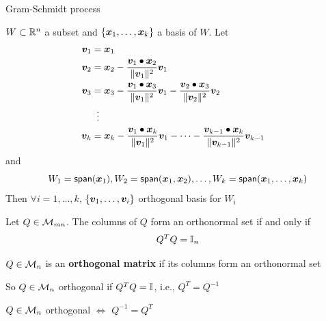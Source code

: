 \documentclass[aspectratio=169]{beamer}\usepackage[]{graphicx}\usepackage[]{xcolor}
\begin{document}
	\begin{frame}{Gram-Schmidt process}
	\begin{theorem}
	$W\subset\mathbb{R}^n$ a subset and $\{\bm{x}_1,\ldots,\bm{x}_k\}$ a basis of $W$. Let
	\begin{align*}
	\bm{v}_1 &= \bm{x}_1 \\
	\bm{v}_2 &= \bm{x}_2 -\frac{\bm{v}_1\bullet\bm{x}_2}{\|\bm{v}_1\|^2}\bm{v}_1 \\
	\bm{v}_3 &= \bm{x}_3 -\frac{\bm{v}_1\bullet\bm{x}_3}{\|\bm{v}_1\|^2}\bm{v}_1 -\frac{\bm{v}_2\bullet\bm{x}_3}{\|\bm{v}_2\|^2}\bm{v}_2 \\
	&\;\;\vdots & \\
	\bm{v}_k &= \bm{x}_k -\frac{\bm{v}_1\bullet\bm{x}_k}{\|\bm{v}_1\|^2}\bm{v}_1 -\cdots-\frac{\bm{v}_{k-1}\bullet\bm{x}_k}{\|\bm{v}_{k-1}\|^2}\bm{v}_{k-1}
	\end{align*}
	and
	\[
	W_1=\mathsf{span}(\bm{x}_1),W_2 = \mathsf{span}(\bm{x}_1,\bm{x}_2),\ldots,
	W_k = \mathsf{span}(\bm{x}_1,\ldots,\bm{x}_k)
	\]
	Then $\forall i=1,\ldots,k$, $\{\bm{v}_1,\ldots,\bm{v}_i\}$ orthogonal basis for $W_i$
	\end{theorem}
	\end{frame}
	
	



\begin{frame}
\begin{theorem}
Let $Q\in\mathcal{M}_{mn}$. The columns of $Q$ form an orthonormal set if and only if
\[
Q^TQ=\mathbb{I}_n
\]
\end{theorem}
\vfill
\begin{definition}
$Q\in\mathcal{M}_n$ is an \textbf{orthogonal matrix} if its columns form an orthonormal set 
\end{definition}
So $Q\in\mathcal{M}_n$ orthogonal if $Q^TQ=\mathbb{I}$, i.e., $Q^T=Q^{-1}$
\vfill
\begin{importanttheorem}
$Q\in\mathcal{M}_n$ orthogonal $\iff$ $Q^{-1} = Q^T$
\end{importanttheorem}
\end{frame}
\end{document}

